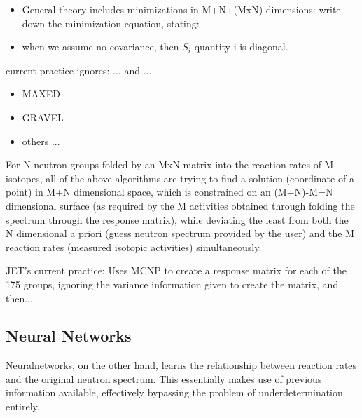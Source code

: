 \documentclass[a4paper, 12pt]{article}
\begin{document}
\begin{itemize}
    \item General theory includes minimizations in M+N+(MxN) dimensions: write down the minimization equation, stating:
    \item when we assume no covariance, then $S_i$ quantity i is diagonal.
\end{itemize}
current practice ignores: ... and ...
\begin{itemize}
    \item MAXED
    \item GRAVEL
    \item others ...
\end{itemize}
For N neutron groups folded by an MxN matrix into the reaction rates of M isotopes,
all of the above algorithms are trying to find a solution (coordinate of a point) in M+N dimensional space, 
which is constrained on an (M+N)-M=N dimensional surface (as required by the M activities obtained through folding the spectrum through the response matrix),
while deviating the least from both the N dimensional a priori (guess neutron spectrum provided by the user) and the M reaction rates (measured isotopic activities) simultaneously.

JET's current practice:
Uses MCNP to create a response matrix for each of the 175 groups, ignoring the variance information given to create the matrix, and then...

\subsection{Neural Networks} \label{Neural Network Theory}
Neuralnetworks, on the other hand, learns the relationship between reaction rates and the original neutron spectrum. This essentially makes use of previous information available, effectively bypassing the problem of underdetermination entirely.
\end{document}

